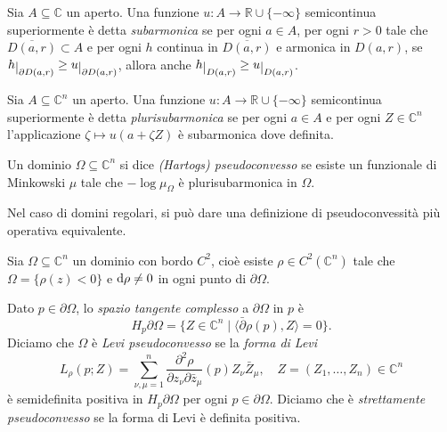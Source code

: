 \begin{defn}
    Sia $A\subseteq\mathbb{C}$ un aperto. Una funzione $u:A \longrightarrow \mathbb{R}\cup\{-\infty\}$ semicontinua superiormente è detta \textit{subarmonica} se per ogni $a \in A$, per ogni $r>0$ tale che $\overline{D(a,r)} \subset A$ e per ogni $h$ continua in $\overline{D(a,r)}$ e armonica in $D(a,r)$, se $h\restrict{\partial D(a,r)} \ge u\restrict{\partial D(a,r)}$, allora anche $h\restrict{D(a,r)} \ge u \restrict{D(a,r)}$.

    Sia $A\subseteq\mathbb{C}^n$ un aperto. Una funzione $u:A \longrightarrow \mathbb{R}\cup\{-\infty\}$ semicontinua superiormente è detta \textit{plurisubarmonica} se per ogni $a \in A$ e per ogni $Z \in \mathbb{C}^n$ l'applicazione $\zeta \longmapsto u(a+\zeta Z)$ è subarmonica dove definita.
\end{defn}

\begin{defn}
    Un dominio $\Omega \subseteq \mathbb{C}^n$ si dice \textit{(Hartogs) pseudoconvesso} se esiste un funzionale di Minkowski $\mu$ tale che $-\log\mu_{\Omega}$ è plurisubarmonica in $\Omega$.
\end{defn}

Nel caso di domini regolari, si può dare una definizione di pseudoconvessità più operativa equivalente.

\begin{defn}
    Sia $\Omega \subseteq \mathbb{C}^n$ un dominio con bordo $C^2$, cioè esiste $\rho \in C^2(\mathbb{C}^n)$ tale che $\Omega=\{\rho(z)<0\}$ e $\mathop{}\!\mathrm{d}\rho\not=0$ in ogni punto di $\partial\Omega$.
    
    Dato $p \in \partial\Omega$, lo \textit{spazio tangente complesso} a $\partial\Omega$ in $p$ è
    \begin{equation}
        H_p\partial\Omega=\{Z \in \mathbb{C}^n \mid \langle \bar{\partial}\rho(p),Z\rangle=0\}.
    \end{equation}
    Diciamo che $\Omega$ è \textit{Levi pseudoconvesso} se la \textit{forma di Levi}
    \begin{equation}
        L_{\rho}(p;Z)=\sum_{\nu,\mu=1}^n \frac{\partial^2\rho}{\partial z_\nu\partial\bar{z}_\mu}(p)Z_\nu\bar{Z}_\mu, \quad Z=(Z_1,\dots,Z_n) \in \mathbb{C}^n
    \end{equation}
      è semidefinita positiva in $H_p\partial\Omega$ per ogni $p \in \partial\Omega$. Diciamo che è \textit{strettamente pseudoconvesso} se la forma di Levi è definita positiva.
\end{defn}

